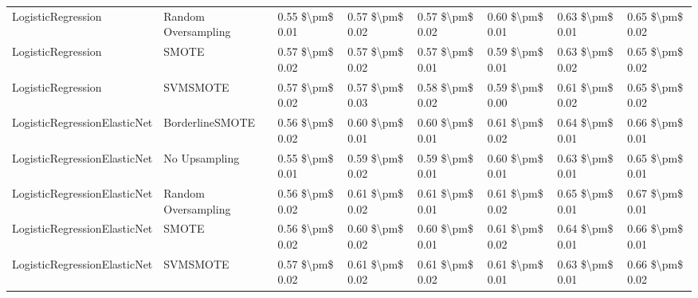 \begin{tabular}{llllllll}
             LogisticRegression &           Random Oversampling &     0.55 \$\textbackslash pm\$ 0.01 &           0.57 \$\textbackslash pm\$ 0.02 &       0.57 \$\textbackslash pm\$ 0.02 &        0.60 \$\textbackslash pm\$ 0.01 &                         0.63 \$\textbackslash pm\$ 0.01 &     0.65 \$\textbackslash pm\$ 0.02 \\
             LogisticRegression &                         SMOTE &     0.57 \$\textbackslash pm\$ 0.02 &           0.57 \$\textbackslash pm\$ 0.02 &       0.57 \$\textbackslash pm\$ 0.01 &        0.59 \$\textbackslash pm\$ 0.01 &                         0.63 \$\textbackslash pm\$ 0.02 &     0.65 \$\textbackslash pm\$ 0.02 \\
             LogisticRegression &                      SVMSMOTE &     0.57 \$\textbackslash pm\$ 0.02 &           0.57 \$\textbackslash pm\$ 0.03 &       0.58 \$\textbackslash pm\$ 0.02 &        0.59 \$\textbackslash pm\$ 0.00 &                         0.61 \$\textbackslash pm\$ 0.02 &     0.65 \$\textbackslash pm\$ 0.02 \\
   LogisticRegressionElasticNet &               BorderlineSMOTE &     0.56 \$\textbackslash pm\$ 0.02 &           0.60 \$\textbackslash pm\$ 0.01 &       0.60 \$\textbackslash pm\$ 0.01 &        0.61 \$\textbackslash pm\$ 0.02 &                         0.64 \$\textbackslash pm\$ 0.01 &     0.66 \$\textbackslash pm\$ 0.01 \\
   LogisticRegressionElasticNet &                 No Upsampling &     0.55 \$\textbackslash pm\$ 0.01 &           0.59 \$\textbackslash pm\$ 0.02 &       0.59 \$\textbackslash pm\$ 0.01 &        0.60 \$\textbackslash pm\$ 0.01 &                         0.63 \$\textbackslash pm\$ 0.01 &     0.65 \$\textbackslash pm\$ 0.01 \\
   LogisticRegressionElasticNet &           Random Oversampling &     0.56 \$\textbackslash pm\$ 0.02 &           0.61 \$\textbackslash pm\$ 0.02 &       0.61 \$\textbackslash pm\$ 0.01 &        0.61 \$\textbackslash pm\$ 0.02 &                         0.65 \$\textbackslash pm\$ 0.01 &     0.67 \$\textbackslash pm\$ 0.01 \\
   LogisticRegressionElasticNet &                         SMOTE &     0.56 \$\textbackslash pm\$ 0.02 &           0.60 \$\textbackslash pm\$ 0.02 &       0.60 \$\textbackslash pm\$ 0.01 &        0.61 \$\textbackslash pm\$ 0.02 &                         0.64 \$\textbackslash pm\$ 0.01 &     0.66 \$\textbackslash pm\$ 0.01 \\
   LogisticRegressionElasticNet &                      SVMSMOTE &     0.57 \$\textbackslash pm\$ 0.02 &           0.61 \$\textbackslash pm\$ 0.02 &       0.61 \$\textbackslash pm\$ 0.02 &        0.61 \$\textbackslash pm\$ 0.01 &                         0.63 \$\textbackslash pm\$ 0.01 &     0.66 \$\textbackslash pm\$ 0.02 \\

\end{tabular}
